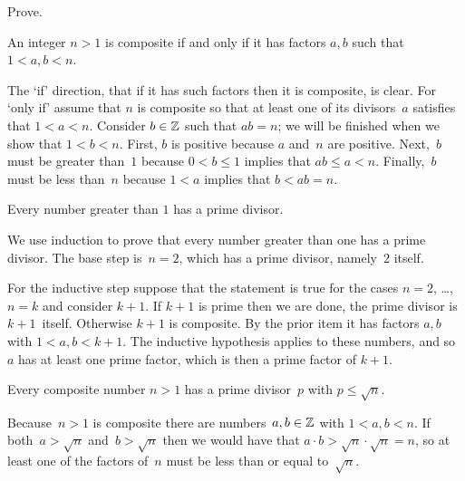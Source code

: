 \documentclass{test}  %
\begin{document}
\begin{problem} Prove.
\begin{exes}
\begin{exercise} 
  An integer $n>1$ is composite if and only if it has factors $a,b$ 
  such that $1<a,b<n$.  
\end{exercise}
\begin{answer}
  The `if' direction, that if it has such factors then it is composite,
  is clear.
  For `only if' assume that $n$ is composite so
  that at least one of its divisors~$a$ satisfies that $1<a<n$.
  Consider $b\in\mathbb{Z}$ such that $ab=n$; we will be finished when we show 
  that $1<b<n$.
  First, $b$ is positive because $a$ and~$n$ are positive.
  Next,~$b$ must be greater than~$1$ because $0<b\leq 1$ 
  implies that $ab\leq a<n$.
  Finally,~$b$ must be less than~$n$ because $1<a$ implies that $b<ab=n$.   
\end{answer}
\begin{exercise} 
  Every number greater than $1$ has a prime divisor.
\end{exercise}
\begin{answer}
  We use induction to prove that
  every number greater than one has a prime divisor.
  The base step is~$n=2$, which has a prime divisor, namely~$2$ itself.

  For the inductive step suppose that the statement is true for the cases 
  $n=2$, \ldots, $n=k$ and consider $k+1$.
  If $k+1$ is prime then we are done, the prime divisor is $k+1$~itself.
  Otherwise $k+1$ is composite.
  By the prior item it has factors $a,b$ with $1<a,b<k+1$.
  The inductive hypothesis applies to these numbers, and so~$a$ has at
  least one prime factor, which is then a prime factor of $k+1$.  
\end{answer}
\begin{exercise} 
  Every composite number $n>1$ has a prime divisor~$p$ 
  with $p\leq \sqrt{n}$.
\end{exercise}
\begin{answer}
  Because~$n>1$ is composite there are numbers~$a,b\in\mathbb{Z}$ with
  $1<a,b<n$.
  If both~$a>\sqrt{n}$ and~$b>\sqrt{n}$ then we would have that
  $a\cdot b>\sqrt{n}\cdot\sqrt{n}=n$,
  so at least one of the factors of~$n$ must be less than or equal 
  to~$\sqrt{n}$.


\end{answer}
\end{exes}
\end{problem}
\end{document}
